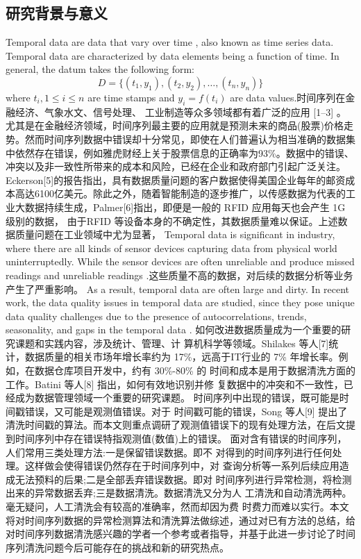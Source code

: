 \documentclass{article}
\begin{document}
\subsection{研究背景与意义}
Temporal data are data that vary over time \cite{DBLP:journals/tkde/JensenS99}, also known as time series data.
Temporal data are characterized by data elements being a function of time. In general, the datum takes the following form:
$$D=\{(t_1, y_1), (t_2, y_2), \dots, (t_n, y_n)\}$$
where $t_i, 1 \leq i \leq n$ are time stamps and $y_i = f(t_i)$ are data values.时间序列在金融经济、气象水文、信号处理、 工业制造等众多领域都有着广泛的应用 [1–3] 。尤其是在金融经济领域，时间序列最主要的应用就是预测未来的商品(股票)价格走势。然而时间序列数据中错误却十分常见，即使在人们普遍认为相当准确的数据集中依然存在错误，例如雅虎财经上关于股票信息的正确率为93\%。数据中的错误、冲突以及非一致性所带来的成本和风险，已经在企业和政府部门引起广泛关注。Eckerson[5]的报告指出，具有数据质量问题的客户数据使得美国企业每年的邮资成本高达6100亿美元。除此之外，随着智能制造的逐步推广，以传感数据为代表的工业大数据持续生成，Palmer[6]指出，即便是一般的 RFID 应用每天也会产生 1G 级别的数据， 由于RFID 等设备本身的不确定性，其数据质量难以保证。上述数据质量问题在工业领域中尤为显著，
Temporal data is significant in industry, where there are all kinds of sensor devices capturing data from physical world uninterruptedly.
While the sensor devices are often unreliable and produce missed readings and unreliable readings \cite{DBLP:conf/pervasive/JefferyAFHW06}.这些质量不高的数据，对后续的数据分析等业务产生了严重影响。
As a result, temporal data are often large and dirty.
In recent work, the data quality issues in temporal data are studied, 
since they pose unique data quality challenges due to the presence of autocorrelations, trends, seasonality, and gaps in the temporal data \cite{DBLP:journals/debu/DasuDS16}.
如何改进数据质量成为一个重要的研究课题和实践内容，涉及统计、管理、计 算机科学等领域。Shilakes 等人[7]统计，数据质量的相关市场年增长率约为 17\%，远高于IT行业的 7\% 年增长率。例如，在数据仓库项目开发中，约有 30\%-80\% 的 时间和成本是用于数据清洗方面的工作。Batini 等人[8] 指出，如何有效地识别并修 复数据中的冲突和不一致性，已经成为数据管理领域一个重要的研究课题。 
时间序列中出现的错误，既可能是时间戳错误，又可能是观测值错误。对于 时间戳可能的错误，Song 等人[9] 提出了清洗时间戳的算法。而本文则重点调研了观测值错误下的现有处理方法，在后文提到时间序列中存在错误特指观测值(数值)上的错误。 
面对含有错误的时间序列，人们常用三类处理方法:一是保留错误数据。即不 对得到的时间序列进行任何处理。这样做会使得错误仍然存在于时间序列中，对 查询分析等一系列后续应用造成无法预料的后果;二是全部丢弃错误数据。即对 时间序列进行异常检测，将检测出来的异常数据丢弃;三是数据清洗。数据清洗又分为人 工清洗和自动清洗两种。毫无疑问，人工清洗会有较高的准确率，然而却因为费 时费力而难以实行。本文将对时间序列数据的异常检测算法和清洗算法做综述，通过对已有方法的总结，给对时间序列数据清洗感兴趣的学者一个参考或者指导，并基于此进一步讨论了时间序列清洗问题今后可能存在的挑战和新的研究热点。
\end{document}
